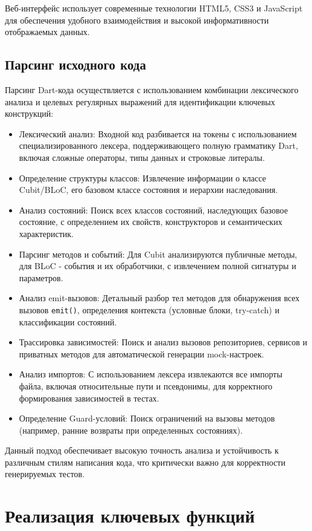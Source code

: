 \documentclass[14pt, russian]{scrartcl}
\begin{document}
Веб-интерфейс использует современные технологии HTML5, CSS3 и JavaScript для обеспечения удобного взаимодействия и высокой информативности отображаемых данных.

\subsection{Парсинг исходного кода}
Парсинг Dart-кода осуществляется с использованием комбинации лексического анализа и целевых регулярных выражений для идентификации ключевых конструкций:

\begin{itemize}
    \item Лексический анализ: Входной код разбивается на токены с использованием специализированного лексера, поддерживающего полную грамматику Dart, включая сложные операторы, типы данных и строковые литералы.
    \item Определение структуры классов: Извлечение информации о классе Cubit/BLoC, его базовом классе состояния и иерархии наследования.
    \item Анализ состояний: Поиск всех классов состояний, наследующих базовое состояние, с определением их свойств, конструкторов и семантических характеристик.
    \item Парсинг методов и событий: Для Cubit анализируются публичные методы, для BLoC - события и их обработчики, с извлечением полной сигнатуры и параметров.
    \item Анализ emit-вызовов: Детальный разбор тел методов для обнаружения всех вызовов \texttt{emit()}, определения контекста (условные блоки, try-catch) и классификации состояний.
    \item Трассировка зависимостей: Поиск и анализ вызовов репозиториев, сервисов и приватных методов для автоматической генерации mock-настроек.
    \item Анализ импортов: С использованием лексера извлекаются все импорты файла, включая относительные пути и псевдонимы, для корректного формирования зависимостей в тестах.
    \item Определение Guard-условий: Поиск ограничений на вызовы методов (например, ранние возвраты при определенных состояниях).
\end{itemize}

Данный подход обеспечивает высокую точность анализа и устойчивость к различным стилям написания кода, что критически важно для корректности генерируемых тестов.

\section{Реализация ключевых функций}
\end{document}
